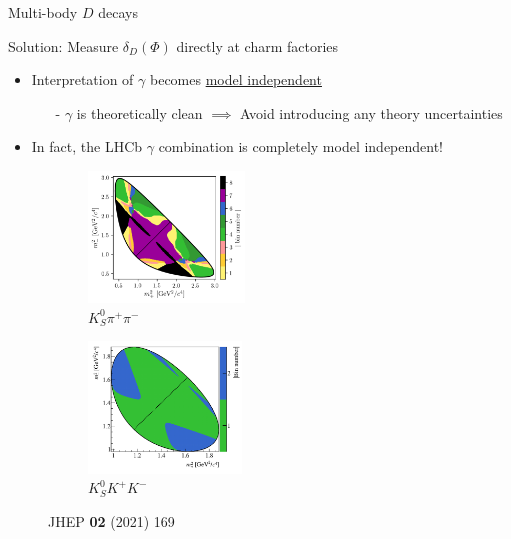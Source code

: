 \documentclass[dvipsnames]{beamer}
\begin{document}
\begin{frame}{Multi-body $D$ decays}
  \begin{center}
    {\large Solution: Measure $\delta_D(\Phi)$ directly at charm factories}
  \end{center}
  \begin{itemize}
    \setlength\itemsep{0.5em}
    \item{Interpretation of $\gamma$ becomes \underline{model independent}}
    \begin{itemize}
      \item[-]{$\gamma$ is theoretically clean $\implies$ Avoid introducing any theory uncertainties}
    \end{itemize}
    \item{In fact, the LHCb $\gamma$ combination is completely model independent!}
    \item[]{\phantom{Furthermore, the interpretation of $\gamma$ only uses relative bin yields $\implies$ No dependence on production or detection asymmetries}}
  \end{itemize}
  \begin{figure}
    \centering
    \begin{subfigure}{0.5\textwidth}
      \centering
      \includegraphics[height = 3.5cm]{Plots/KsPiPi_optimal.png}
      \vspace{-0.3cm}
      \caption*{$K_S^0\pi^+\pi^-$}
    \end{subfigure}%
    \begin{subfigure}{0.5\textwidth}
      \centering
      \includegraphics[height = 3.5cm]{Plots/KsKK_binning.png}
      \vspace{-0.3cm}
      \caption*{$K_S^0K^+K^-$}
    \end{subfigure}
    \vspace{-0.9cm}
    \caption*{\tiny JHEP \textbf{02} (2021) 169}
  \end{figure}
\end{frame}
\end{document}
